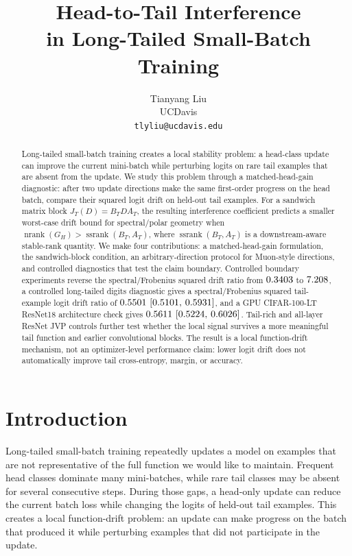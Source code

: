 \documentclass{article}
\title{Head-to-Tail Interference\\in Long-Tailed Small-Batch Training}
\author{Tianyang Liu\\UCDavis\\\texttt{tlyliu@ucdavis.edu}}
\theoremstyle{definition}
\newcommand{\nrank}{\operatorname{nrank}}
\newcommand{\ssrank}{\operatorname{ssrank}}
\begin{document}
\maketitle

\begin{abstract}
Long-tailed small-batch training creates a local stability problem: a head-class update can improve the current mini-batch while perturbing logits on rare tail examples that are absent from the update. We study this problem through a matched-head-gain diagnostic: after two update directions make the same first-order progress on the head batch, compare their squared logit drift on held-out tail examples. For a sandwich matrix block \(J_T(D)=B_TDA_T\), the resulting interference coefficient predicts a smaller worst-case drift bound for spectral/polar geometry when \(\nrank(G_H)>\ssrank(B_T,A_T)\), where \(\ssrank(B_T,A_T)\) is a downstream-aware stable-rank quantity. We make four contributions: a matched-head-gain formulation, the sandwich-block condition, an arbitrary-direction protocol for Muon-style directions, and controlled diagnostics that test the claim boundary. Controlled boundary experiments reverse the spectral/Frobenius squared drift ratio from \(0.3403\) to \(7.208\), a controlled long-tailed digits diagnostic gives a spectral/Frobenius squared tail-example logit drift ratio of \(0.5501 ~\text{[0.5101,\hspace{0.35em}0.5931]}\), and a GPU CIFAR-100-LT ResNet18 architecture check gives \(0.5611 ~\text{[0.5224,\hspace{0.35em}0.6026]}\). Tail-rich and all-layer ResNet JVP controls further test whether the local signal survives a more meaningful tail function and earlier convolutional blocks. The result is a local function-drift mechanism, not an optimizer-level performance claim: lower logit drift does not automatically improve tail cross-entropy, margin, or accuracy.
\end{abstract}

\section{Introduction}

Long-tailed small-batch training repeatedly updates a model on examples that are not representative of the full function we would like to maintain. Frequent head classes dominate many mini-batches, while rare tail classes may be absent for several consecutive steps. During those gaps, a head-only update can reduce the current batch loss while changing the logits of held-out tail examples. This creates a local function-drift problem: an update can make progress on the batch that produced it while perturbing examples that did not participate in the update.
\end{document}
